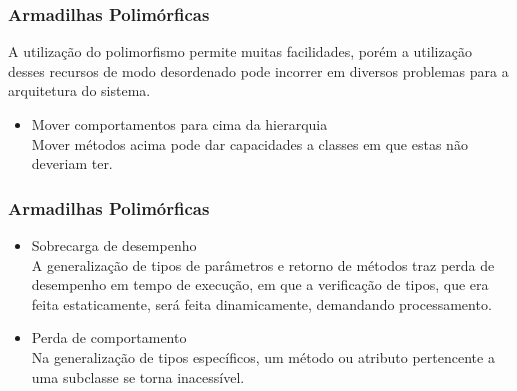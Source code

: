 \begin{frame}
\frametitle{Armadilhas Polimórficas}
A utilização do polimorfismo permite muitas facilidades, porém a utilização desses recursos de modo desordenado pode incorrer em diversos problemas para a arquitetura do sistema.

\begin{itemize}
\item Mover comportamentos para cima da hierarquia\\{\footnotesize Mover métodos acima pode dar capacidades a classes em que estas não deveriam ter.}

\end{itemize}
\end{frame}

\begin{frame}
\frametitle{Armadilhas Polimórficas}

\begin{itemize}
\item Sobrecarga de desempenho\\{\footnotesize A generalização de tipos de parâmetros e retorno de métodos traz perda de desempenho em tempo de execução, em que a verificação de tipos, que era feita estaticamente, será feita dinamicamente, demandando processamento.}
\item Perda de comportamento\\{\footnotesize Na generalização de tipos específicos, um método ou atributo pertencente a uma subclasse se torna inacessível.}
\end{itemize}

\end{frame}